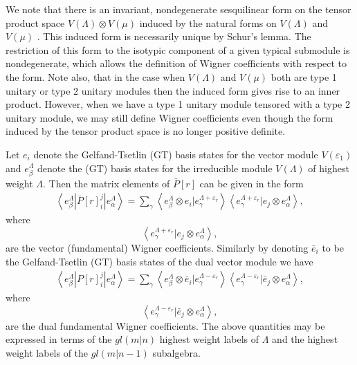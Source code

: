 \documentclass[12pt]{article}
\begin{document}
We note that there is an invariant,
nondegenerate sesquilinear form on the tensor product space $V(\Lambda) \otimes V(\mu)$ induced by the natural forms on $ V(\Lambda)$ and $V(\mu)$ \cite{GIW1}. This induced form is necessarily unique by Schur's lemma. The restriction of this form to the isotypic component of a given typical submodule is nondegenerate, which allows the definition of Wigner coefficients with respect to the form. Note also, that in the case when $V(\Lambda)$ and $V(\mu)$ both are type 1 unitary or type 2 unitary modules then the induced form gives rise to an inner product. However, when we have a type 1 unitary module tensored with a type 2 unitary module, we may still define Wigner coefficients even though the form induced by the tensor product space is no longer positive definite.

Let $e_i$ denote the Gelfand-Tsetlin (GT) basis states for the vector module $V(\varepsilon_1)$ and ${e^\Lambda_\beta}$ denote the (GT) basis states for the irreducible module $V(\Lambda)$ of highest weight $\Lambda$. Then the matrix elements of $\bar{P}[r]$ can be given in the form
\begin{align}
\left\langle e^\Lambda_\beta | \bar{P}[r]^j_i | e^{\Lambda}_\alpha \right\rangle =
\sum_\gamma \left\langle e^\Lambda_\beta \otimes e_i | e^{\Lambda + \varepsilon_r}_\gamma \right\rangle
\left\langle e^{\Lambda+\varepsilon_r}_\gamma | e_j \otimes e^\Lambda_\alpha \right\rangle, \label{BarPij}
\end{align}
where
$$
\left\langle e^{\Lambda+\varepsilon_r}_\gamma | e_j \otimes e^\Lambda_\alpha \right\rangle,
$$
are the vector (fundamental) Wigner coefficients.
Similarly by denoting $\bar{e}_i$ to be the Gelfand-Tsetlin (GT) basis states of the dual vector module we have 
\begin{align}
\left\langle e^\Lambda_\beta | P[r]^j_i | e^{\Lambda}_\alpha \right\rangle =
\sum_\gamma \left\langle e^\Lambda_\beta \otimes \bar{e}_i | e^{\Lambda - \varepsilon_r}_\gamma \right\rangle
\left\langle e^{\Lambda-\varepsilon_r}_\gamma | \bar{e}_j \otimes e^\Lambda_\alpha \right\rangle, \label{Pij}
\end{align}
where
$$
\left\langle e^{\Lambda-\varepsilon_r}_\gamma | \bar{e}_j \otimes e^\Lambda_\alpha \right\rangle,
$$
are the dual fundamental Wigner coefficients. The above quantities may be expressed in terms of the $gl(m|n)$ highest weight labels of $\Lambda$ and the highest weight labels of the $gl(m|n-1)$ subalgebra.
\end{document}
